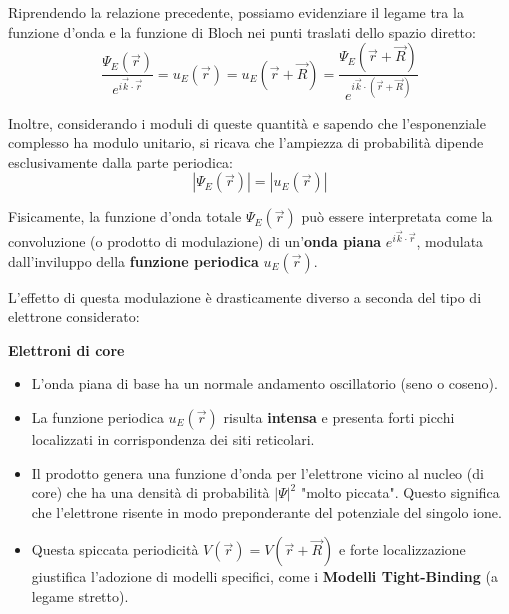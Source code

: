 Riprendendo la relazione precedente, possiamo evidenziare il legame tra la funzione d'onda e la funzione di Bloch nei punti traslati dello spazio diretto:
\begin{equation}
    \frac{\Psi_E(\vec{r})}{e^{i\vec{k}\cdot\vec{r}}} = u_E(\vec{r}) = u_E(\vec{r} + \vec{R}) = \frac{\Psi_E(\vec{r} + \vec{R})}{e^{i\vec{k}\cdot(\vec{r} + \vec{R})}}
\end{equation}

Inoltre, considerando i moduli di queste quantità e sapendo che l'esponenziale complesso ha modulo unitario, si ricava che l'ampiezza di probabilità dipende esclusivamente dalla parte periodica:
\begin{equation}
    |\Psi_E(\vec{r})| = |u_E(\vec{r})|
\end{equation}

Fisicamente, la funzione d'onda totale \(\Psi_E(\vec{r})\) può essere interpretata come la convoluzione (o prodotto di modulazione) di un'\textbf{onda piana} \(e^{i\vec{k}\cdot\vec{r}}\), modulata dall'inviluppo della \textbf{funzione periodica} \(u_E(\vec{r})\).

L'effetto di questa modulazione è drasticamente diverso a seconda del tipo di elettrone considerato:

\begin{example}{\textbf{Elettroni di core}}
\begin{itemize}
    \item L'onda piana di base ha un normale andamento oscillatorio (seno o coseno).
    \item La funzione periodica \(u_E(\vec{r})\) risulta \textbf{intensa} e presenta forti picchi localizzati in corrispondenza dei siti reticolari.
    \item Il prodotto genera una funzione d'onda per l'elettrone vicino al nucleo (di core) che ha una densità di probabilità \(|\Psi|^2\) "molto piccata". Questo significa che l'elettrone risente in modo preponderante del potenziale del singolo ione.
    \item Questa spiccata periodicità \(V(\vec{r}) = V(\vec{r} + \vec{R})\) e forte localizzazione giustifica l'adozione di modelli specifici, come i \textbf{Modelli Tight-Binding} (a legame stretto).
\end{itemize}
\end{example}

